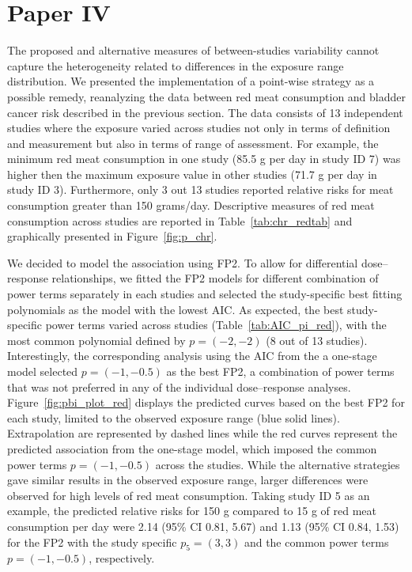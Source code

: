 \documentclass[11pt,a4paper,twoside,openany]{book}\usepackage{knitr}
\begin{document}
{{\section{Paper IV}\label{sec:res_paperIV}

\noindent The proposed and alternative measures of between-studies variability cannot capture the heterogeneity related to differences in the exposure range distribution. We presented the implementation of a point-wise strategy as a possible remedy, reanalyzing the data between red meat consumption and bladder cancer risk described in the previous section.
The data consists of 13 independent studies where the exposure varied across studies not only in terms of definition and measurement but also in terms of range of assessment. For example, the minimum red meat consumption in one study (85.5 g per day in study ID 7) was higher then the maximum exposure value in other studies (71.7 g per day in study ID 3). Furthermore, only 3 out 13 studies reported relative risks for meat consumption greater than 150 grams/day. Descriptive measures of red meat consumption across studies are reported in Table~\ref{tab:chr_redtab} and graphically presented in Figure~\ref{fig:p_chr}.

We decided to model the association using FP2. To allow for differential dose--response relationships, we fitted the FP2 models for different combination of power terms separately in each studies and selected the study-specific best fitting polynomials as the model with the lowest AIC. As expected, the best study-specific power terms varied across studies (Table~\ref{tab:AIC_pi_red}), with the most common polynomial defined by $p = (-2, -2)$ (8 out of 13 studies). Interestingly, the corresponding analysis using the AIC from the a one-stage model selected $p = (-1, -0.5)$ as the best FP2, a combination of power terms that was not preferred in any of the individual dose--response analyses. Figure~\ref{fig:pbi_plot_red} displays the predicted curves based on the best FP2 for each study, limited to the observed exposure range (blue solid lines). Extrapolation are represented by dashed lines while the red curves represent the predicted association from the one-stage model, which imposed the common power terms $p = (-1, -0.5)$ across the studies. While the alternative strategies gave similar results in the observed exposure range, larger differences were observed for high levels of red meat consumption. Taking study ID 5 as an example, the predicted relative risks for 150 g compared to 15 g of red meat consumption per day were 2.14 (95\% CI 0.81, 5.67) and 1.13 (95\% CI 0.84, 1.53) for the FP2 with the study specific $p_5 = (3, 3)$ and the common power terms $p = (-1, -0.5)$, respectively. 

}}
\end{document}
